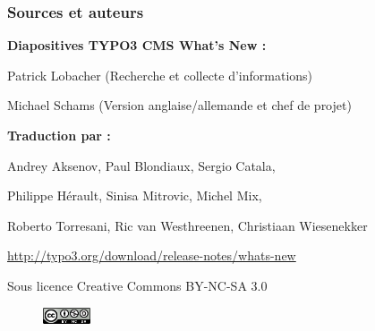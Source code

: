 \begin{frame}[fragile]
	\frametitle{Sources et auteurs}

	\centerline{\textbf{Diapositives TYPO3 CMS What's New :}}
	\centerline{Patrick Lobacher (Recherche et collecte d'informations)}
	\centerline{Michael Schams (Version anglaise/allemande et chef de projet)}

	\begin{center}
		\centerline{\textbf{Traduction par :}}
		\centerline{Andrey Aksenov, Paul Blondiaux, Sergio Catala,}
		\centerline{Philippe Hérault, Sinisa Mitrovic, Michel Mix,}
		\centerline{Roberto Torresani, Ric van Westhreenen, Christiaan Wiesenekker}
	\end{center}

	\smaller\begin{center}\url{http://typo3.org/download/release-notes/whats-new}\end{center}\normalsize

	\smaller\begin{center}Sous licence Creative Commons BY-NC-SA 3.0\end{center}\normalsize
	\begin{figure}\vspace*{-0.2cm}
		\includegraphics[width=1.4cm]{Images/SourcesAndAuthors/CreativeCommons-BY-NC-SA.png}
	\end{figure}

\end{frame}


